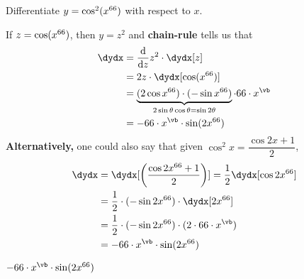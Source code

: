 



\SUBTRACT{}\vb

\question[3] Differentiate $y=\cos^2(x^{66})$ with respect to $x$.

\watchout

\begin{solution}[\halfpage]
  If $z = \cos(x^{66})$, then $y = z^2$ and \textbf{chain-rule} tells us that 
  \begin{align}
    \dydx &= \dfrac{\mathrm{d}}{\mathrm{d}z}z^2\cdot\dydx[z] \\
    &= 2z\cdot\dydx[\cos(x^{\va})] \\
    &= \underbrace{(2\cos x^{\va})\cdot(-\sin x^{\va})}_{2\sin\theta\cos\theta = \sin 2\theta}\cdot\va\cdot x^{\vb} \\
    &= -\va\cdot x^{\vb}\cdot\sin (2x^{\va})
  \end{align}
  \textbf{Alternatively,} one could also say that given $\cos^2 x = \dfrac{\cos 2x + 1}{2}$,
  \begin{align}
    \dydx &= \dydx[\left( \dfrac{\cos 2x^{\va} + 1}{2}\right)] 
    = \dfrac{1}{2}\dydx[\cos 2x^{\va}] \\
    &= \dfrac{1}{2}\cdot (-\sin 2x^{\va} )\cdot\dydx[2x^{\va}] \\
    &= \dfrac{1}{2}\cdot (-\sin 2x^{\va} )\cdot (2\cdot\va\cdot x^{\vb}) \\
    &= -\va\cdot x^{\vb}\cdot\sin (2x^{\va})
  \end{align}
\end{solution}

\ifprintanswers\begin{codex}
 $-\va\cdot x^{\vb}\cdot\sin (2x^{\va})$
\end{codex}\fi
